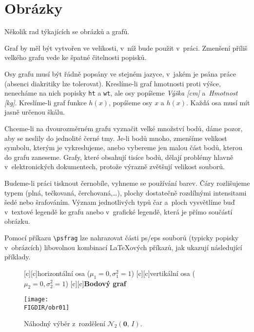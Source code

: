 \section{Obrázky}

Několik rad týkajících se obrázků a grafů.
\begin{compactitem}
\item Graf by měl být vytvořen ve velikosti, v~níž bude použit
  v~práci. Zmenšení příliš velkého grafu vede ke špatné čitelnosti
  popisků.
\item Osy grafu musí být řádně popsány ve stejném jazyce, v~jakém je
  psána práce (absenci diakritiky lze tolerovat). Kreslíme-li graf
  hmotnosti proti výšce, nenecháme na nich popisky \texttt{ht} a
  \texttt{wt}, ale osy popíšeme \emph{Výška [cm]} a~\emph{Hmotnost
    [kg]}. Kreslíme-li graf funkce $h(x)$, popíšeme osy $x$ a $h(x)$.
  Každá osa musí mít jasně určenou škálu.
\item Chceme-li na dvourozměrném grafu vyznačit velké množství bodů,
  dáme pozor, aby se neslily do jednolité černé tmy. Je-li bodů mnoho,
  zmenšíme velikost symbolu, kterým je vykreslujeme, anebo vybereme
  jen malou část bodů, kterou do grafu zaneseme. Grafy, které obsahují
  tisíce bodů, dělají problémy hlavně v~elektronických dokumentech,
  protože výrazně zvětšují velikost souborů.
\item Budeme-li práci tisknout černobíle, vyhneme se používání barev.
  Čáry rozlišujeme typem (plná, tečkovaná, čerchovaná,\ldots), plochy
  dostatečně rozdílnými intensitami šedé nebo šrafováním. Význam
  jednotlivých typů čar a~ploch vysvětlíme buď v~textové legendě ke
  grafu anebo v~grafické legendě, která je přímo součástí obrázku.
\end{compactitem}

Pomocí příkazu \texttt{{\textbackslash}psfrag} lze nahrazovat části
\textsf{ps/eps} souborů (typicky popisky v~obrázcích) libovolnou
kombinací {\LaTeX}ových příkazů, jak ukazují následující příklady.



\begin{figure}[ht]\centering
  [c][c]{\textsf{\large horizontální osa ($\mu_1 = 0, \sigma_1^2 = 1$)}}
  [c][c]{\textsf{\large vertikální osa ($\mu_2 = 0, \sigma_2^2 = 1$)}}
  [c][c]{\textsf{\bfseries\Large Bodový graf}}
  
  \texttt{[image: \\FIGDIR/obr01]}     
  
  \caption{Náhodný výběr z~rozdělení $\mathcal{N}_2(\boldsymbol{0},\,I)$.}
  \label{obr03:Nvyber}
  
  \end{figure}
  
